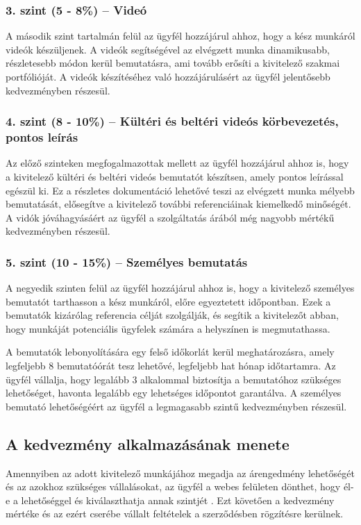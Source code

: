 \subsubsection{3. szint (5 - 8\%) – Videó} 
A második szint tartalmán felül az ügyfél hozzájárul ahhoz, hogy a kész munkáról videók készüljenek. A videók segítségével az elvégzett munka dinamikusabb, részletesebb módon kerül bemutatásra, ami tovább erősíti a kivitelező szakmai portfólióját. A videók készítéséhez való hozzájárulásért az ügyfél jelentősebb kedvezményben részesül.

\subsubsection{4. szint (8 - 10\%) – Kültéri és beltéri videós körbevezetés, pontos leírás} 
Az előző szinteken megfogalmazottak mellett az ügyfél hozzájárul ahhoz is, hogy a kivitelező kültéri és beltéri videós bemutatót készítsen, amely pontos leírással egészül ki. Ez a részletes dokumentáció lehetővé teszi az elvégzett munka mélyebb bemutatását, elősegítve a kivitelező további referenciáinak kiemelkedő minőségét. A vidók jóváhagyásáért az ügyfél a szolgáltatás árából még nagyobb mértékű kedvezményben részesül.

\subsubsection{5. szint (10 - 15\%) – Személyes bemutatás} 
A negyedik szinten felül az ügyfél hozzájárul ahhoz is, hogy a kivitelező személyes bemutatót tarthasson a kész munkáról, előre egyeztetett időpontban. Ezek a bemutatók kizárólag referencia célját szolgálják, és segítik a kivitelezőt abban, hogy munkáját potenciális ügyfelek számára a helyszínen is megmutathassa.

A bemutatók lebonyolítására egy felső időkorlát kerül meghatározásra, amely legfeljebb 8 bemutatóórát tesz lehetővé, legfeljebb hat hónap időtartamra. Az ügyfél vállalja, hogy legalább 3 alkalommal biztosítja a bemutatóhoz szükséges lehetőséget, havonta legalább egy lehetséges időpontot garantálva. A személyes bemutató lehetőségéért az ügyfél a legmagasabb szintű kedvezményben részesül.

\subsection{A kedvezmény alkalmazásának menete}
Amennyiben az adott kivitelező munkájához megadja az árengedmény lehetőségét és az azokhoz szükséges vállalásokat,
az ügyfél a webes felületen dönthet, hogy él-e a lehetőséggel és kiválaszthatja annak szintjét .
Ezt követően a kedvezmény mértéke és az ezért cserébe vállalt feltételek a szerződésben rögzítésre kerülnek.

